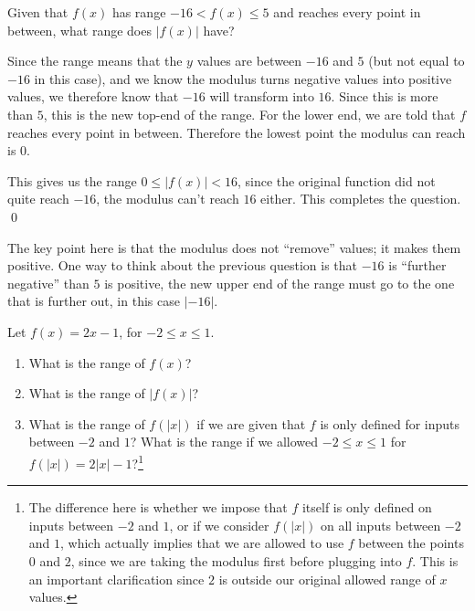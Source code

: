 \begin{example}
    Given that $f(x)$ has range $-16 < f(x) \leq 5$ and reaches every point in between, what range does $|f(x)|$ have?
\end{example}
\begin{solution}
    Since the range means that the $y$ values are between $-16$ and $5$ (but not equal to $-16$ in this case), and we know the 
    modulus turns negative values into positive values, we therefore know that $-16$ will transform into $16$. Since this is more than $5$, this is the new top-end of the range. 
    For the lower end, we are told that $f$ reaches every point in between. Therefore the lowest point the modulus can reach is $0$.

    This gives us the range $0 \leq |f(x)| < 16$, since the original function did not quite reach $-16$, the modulus can't reach $16$ either. This completes the question.
    \qed
\end{solution}
The key point here is that the modulus does not ``remove'' values; it makes them positive. One way to think about the previous question is that 
$-16$ is ``further negative'' than $5$ is positive, the new upper end of the range must go to the one that is further out, in this case $|-16|$.


\begin{example}
    Let $f(x) = 2x - 1$, for $-2 \leq x \leq 1$.

    \begin{enumerate}
        \item What is the range of $f(x)$?
        \item What is the range of $|f(x)|$?
        \item What is the range of $f(|x|)$ if we are given that $f$ is only defined for inputs between $-2$ and $1$? What is the range if we allowed $-2 \leq x \leq 1$ for $f(|x|) = 2|x| - 1$?\footnote{The difference here is whether we impose that $f$ itself is only defined on inputs between $-2$ and $1$, or if we consider $f(|x|)$ on all inputs between $-2$ and $1$, which actually implies that we are allowed to use $f$ between the points $0$ and $2$, since we are taking the modulus first before plugging into $f$. This is an important clarification since $2$ is outside our original allowed range of $x$ values.}
    \end{enumerate}
\end{example}

